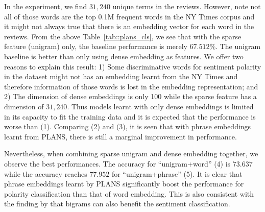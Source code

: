 In the experiment, we find $31,240$ unique terms in the reviews. However, note
not all of those words are the top 0.1M frequent words in the NY Times corpus
and it might not always true that there is an embedding vector for each word in
the reviews. From the above Table~\ref{tab::plans_cls}, we see that with the
sparse feature (unigram) only, the baseline performance is merely $67.512\%$.
The unigram baseline is better than only using dense embedding as features.  We
offer two reasons to explain this result: 1) Some discriminative words for
sentiment polarity in the dataset might not has an embedding learnt from the NY
Times and therefore information of those words is lost in the embedding
representation; and 2) The dimension of dense embeddings is only 100 while the
sparse feature has a dimension of $31,240$. Thus models learnt with only dense
embeddings is limited in its capacity to fit the training data and it is
expected that the performance is worse than (1). Comparing (2) and (3), it is
seen that with phrase embeddings learnt from PLANS, there is still a marginal
improvement in performance.

Nevertheless, when combining sparse unigram and dense embedding together, we
observe the best performances. The accuracy for ``unigram+word'' (4) is $73.637$
while the accuracy reaches $77.952$ for ``unigram+phrase'' (5). It is clear that
phrase embeddings learnt by PLANS significantly boost the performance for
polarity classification than that of word embedding. This is also consistent
with the finding by \cite{pang2002thumbs} that bigrams can also benefit the
sentiment classification.

